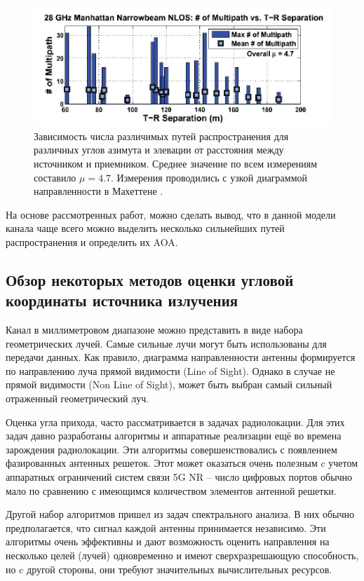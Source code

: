 \begin{figure}[ht!]
    \centering
    \includegraphics[width=0.8\linewidth]{figs/fig3.2}
    \caption{
        Зависимость числа различимых путей распространения для различных углов азимута и элевации от расстояния между источником и приемником.
        Среднее значение по всем измерениям составило $\mu=4.7$. Измерения проводились с узкой диаграммой направленности в Махеттене \cite{Rappaport2015}.}
    \label{fig:3.2}
\end{figure}

На основе рассмотренных работ, можно сделать вывод, что в данной модели
канала чаще всего можно выделить несколько сильнейших путей
распространения и определить их AOA.

\subsection{Обзор некоторых методов оценки угловой координаты источника излучения}
\label{sec:review}

Канал в миллиметровом диапазоне можно представить в виде
набора геометрических лучей.  Самые сильные лучи могут быть
использованы для передачи данных. Как правило, диаграмма направленности
антенны формируется по направлению луча прямой видимости (Line of Sight).
Однако в случае не прямой видимости (Non Line of Sight), может быть
выбран самый сильный отраженный геометрический луч. 

Оценка угла прихода, часто рассматривается в задачах
радиолокации.  Для этих задач  давно разработаны алгоритмы и аппаратные реализации
ещё во времена зарождения радиолокации. Эти алгоритмы совершенствовались с
появлением фазированных антенных решеток.  
Этот может оказаться очень  полезным c учетом  аппаратных ограничений систем
связи 5G NR -- число цифровых портов обычно мало по сравнению с имеющимся
количеством элементов антенной решетки. 

Другой набор алгоритмов пришел из задач спектрального анализа.  В них обычно
предполагается, что сигнал каждой антенны принимается независимо.  Эти алгоритмы
очень эффективны и дают возможность оценить направления на несколько целей
(лучей) одновременно и имеют сверхразрешающую способность, но c другой стороны,
они требуют значительных вычислительных ресурсов.  

